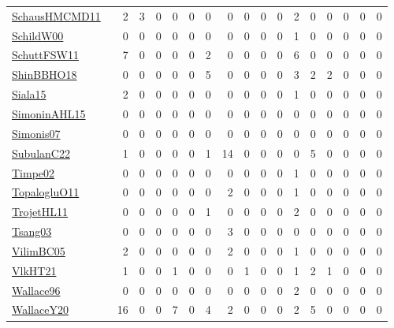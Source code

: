 {\begin{longtable}{l*{16}{r}}
\href{articles/SchausHMCMD11.pdf}{SchausHMCMD11}~\cite{SchausHMCMD11} & 2 & 3 & 0 & 0 & 0 & 0 & 0 & 0 & 0 & 0 & 2 & 0 & 0 & 0 & 0 & 0\\
\href{articles/SchildW00.pdf}{SchildW00}~\cite{SchildW00} & 0 & 0 & 0 & 0 & 0 & 0 & 0 & 0 & 0 & 0 & 1 & 0 & 0 & 0 & 0 & 0\\
\href{articles/SchuttFSW11.pdf}{SchuttFSW11}~\cite{SchuttFSW11} & 7 & 0 & 0 & 0 & 0 & 2 & 0 & 0 & 0 & 0 & 6 & 0 & 0 & 0 & 0 & 0\\
\href{articles/ShinBBHO18.pdf}{ShinBBHO18}~\cite{ShinBBHO18} & 0 & 0 & 0 & 0 & 0 & 5 & 0 & 0 & 0 & 0 & 3 & 2 & 2 & 0 & 0 & 0\\
\href{articles/Siala15.pdf}{Siala15}~\cite{Siala15} & 2 & 0 & 0 & 0 & 0 & 0 & 0 & 0 & 0 & 0 & 1 & 0 & 0 & 0 & 0 & 0\\
\href{articles/SimoninAHL15.pdf}{SimoninAHL15}~\cite{SimoninAHL15} & 0 & 0 & 0 & 0 & 0 & 0 & 0 & 0 & 0 & 0 & 0 & 0 & 0 & 0 & 0 & 0\\
\href{articles/Simonis07.pdf}{Simonis07}~\cite{Simonis07} & 0 & 0 & 0 & 0 & 0 & 0 & 0 & 0 & 0 & 0 & 0 & 0 & 0 & 0 & 0 & 0\\
\href{articles/SubulanC22.pdf}{SubulanC22}~\cite{SubulanC22} & 1 & 0 & 0 & 0 & 0 & 1 & 14 & 0 & 0 & 0 & 0 & 5 & 0 & 0 & 0 & 0\\
\href{articles/Timpe02.pdf}{Timpe02}~\cite{Timpe02} & 0 & 0 & 0 & 0 & 0 & 0 & 0 & 0 & 0 & 0 & 1 & 0 & 0 & 0 & 0 & 0\\
\href{articles/TopalogluO11.pdf}{TopalogluO11}~\cite{TopalogluO11} & 0 & 0 & 0 & 0 & 0 & 0 & 2 & 0 & 0 & 0 & 1 & 0 & 0 & 0 & 0 & 0\\
\href{articles/TrojetHL11.pdf}{TrojetHL11}~\cite{TrojetHL11} & 0 & 0 & 0 & 0 & 0 & 1 & 0 & 0 & 0 & 0 & 2 & 0 & 0 & 0 & 0 & 0\\
\href{articles/Tsang03.pdf}{Tsang03}~\cite{Tsang03} & 0 & 0 & 0 & 0 & 0 & 0 & 3 & 0 & 0 & 0 & 0 & 0 & 0 & 0 & 0 & 0\\
\href{articles/VilimBC05.pdf}{VilimBC05}~\cite{VilimBC05} & 2 & 0 & 0 & 0 & 0 & 0 & 2 & 0 & 0 & 0 & 1 & 0 & 0 & 0 & 0 & 0\\
\href{articles/VlkHT21.pdf}{VlkHT21}~\cite{VlkHT21} & 1 & 0 & 0 & 1 & 0 & 0 & 0 & 1 & 0 & 0 & 1 & 2 & 1 & 0 & 0 & 0\\
\href{articles/Wallace96.pdf}{Wallace96}~\cite{Wallace96} & 0 & 0 & 0 & 0 & 0 & 0 & 0 & 0 & 0 & 0 & 2 & 0 & 0 & 0 & 0 & 0\\
\href{articles/WallaceY20.pdf}{WallaceY20}~\cite{WallaceY20} & 16 & 0 & 0 & 7 & 0 & 4 & 2 & 0 & 0 & 0 & 2 & 5 & 0 & 0 & 0 & 0\\

\end{longtable}}
